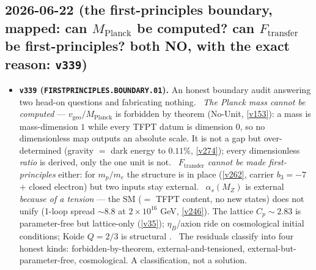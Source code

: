 \subsection*{2026-06-22 (the first-principles boundary, mapped: can $M_{\mathrm{Planck}}$ be computed? can $F_{\mathrm{transfer}}$ be first-principles? both NO, with the exact reason: \texttt{v339})}
\begin{itemize}
\item \textbf{\texttt{v339} (\texttt{FIRSTPRINCIPLES.BOUNDARY.01}).} An honest boundary audit answering two
head-on questions and fabricating nothing. \mE\ \emph{The Planck mass cannot be computed} ---
$v_{\mathrm{geo}}/M_{\mathrm{Planck}}$ is forbidden by theorem (No-Unit, \vref{v153}): a mass is mass-dimension
$1$ while every TFPT datum is dimension $0$, so no dimensionless map outputs an absolute scale. It is not a gap but
over-determined (gravity $=$ dark energy to $0.11\%$, \vref{v274}); every dimensionless \emph{ratio} is derived, only
the one unit is not. \mE\ \emph{$F_{\mathrm{transfer}}$ cannot be made first-principles} either: for $m_p/m_e$ the
structure is in place (\vref{v262}, carrier $b_3{=}{-}7$ $+$ closed electron) but two inputs stay external. \mX\
$\alpha_s(M_Z)$ is external \emph{because of a tension} --- the SM ($=$ TFPT content, no new states) does not unify
(1-loop spread ${\sim}8.8$ at $2{\times}10^{16}$ GeV, \vref{v246}). The lattice $C_p\!\sim\!2.83$ is parameter-free
but lattice-only (\vref{v35}); $\eta_B$/axion ride on cosmological initial conditions; Koide $Q{=}2/3$ is structural
\mE. \mE\ The residuals classify into four honest kinds: forbidden-by-theorem, external-and-tensioned,
external-but-parameter-free, cosmological. A classification, not a solution.
\end{itemize}


